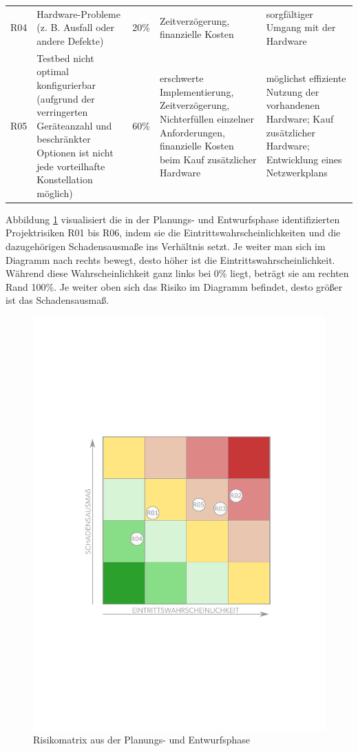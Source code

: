 \documentclass[../review_3.tex]{subfiles}
\begin{document}
\begin{longtable}[h]{l p{} p{} p{} p{}}
    R04         & Hardware-Probleme (z. B. Ausfall oder andere Defekte)                                                                                                     & 20\%                                  & Zeitverzögerung, finanzielle Kosten                                                                                                                              & sorgfältiger Umgang mit der Hardware                                                                                                                                                                                         \\
    R05         & Testbed nicht optimal konfigurierbar (aufgrund der verringerten Geräteanzahl und beschränkter Optionen ist nicht jede vorteilhafte Konstellation möglich) & 60\%                                  & erschwerte Implementierung, Zeitverzögerung, Nichterfüllen einzelner Anforderungen, finanzielle Kosten beim Kauf zusätzlicher Hardware                           & möglichst effiziente Nutzung der vorhandenen Hardware; Kauf zusätzlicher Hardware; Entwicklung eines Netzwerkplans                                                                                                           \\ \bottomrule
\end{longtable}

Abbildung \ref{riskomatrix} visualisiert die in der Planungs- und Entwurfsphase identifizierten Projektrisiken R01 bis R06, indem sie die Eintrittswahrscheinlichkeiten und die dazugehörigen Schadensausmaße ins Verhältnis setzt. Je weiter man sich im Diagramm nach rechts bewegt, desto höher ist die Eintrittswahrscheinlichkeit. Während diese Wahrscheinlichkeit ganz links bei 0\% liegt, beträgt sie am rechten Rand 100\%. Je weiter oben sich das Risiko im Diagramm befindet, desto größer ist das Schadensausmaß.

\begin{figure} [H]
    \centering
    \includegraphics[width = 0.5\linewidth]{img/risikomatrix.pdf}
    \caption{Risikomatrix aus der Planungs- und Entwurfsphase}
    \label{riskomatrix}
\end{figure}
\end{document}
